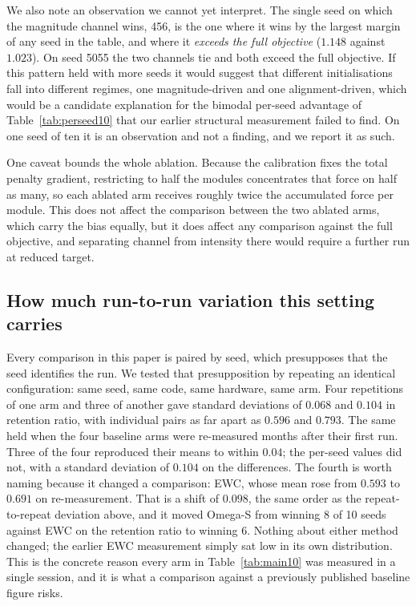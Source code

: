 \documentclass[11pt,a4paper]{article}
\begin{document}
We also note an observation we cannot yet interpret. The single seed on which
the magnitude channel wins, 456, is the one where it wins by the largest margin
of any seed in the table, and where it \emph{exceeds the full objective}
($1.148$ against $1.023$). On seed 5055 the two channels tie and both exceed
the full objective. If this pattern held with more seeds it would suggest that
different initialisations fall into different regimes, one magnitude-driven and
one alignment-driven, which would be a candidate explanation for the bimodal
per-seed advantage of Table~\ref{tab:perseed10} that our earlier structural
measurement failed to find. On one seed of ten it is an observation and not a
finding, and we report it as such.

One caveat bounds the whole ablation. Because the calibration fixes the total
penalty gradient, restricting to half the modules concentrates that force on
half as many, so each ablated arm receives roughly twice the accumulated force
per module. This does not affect the comparison between the two ablated arms,
which carry the bias equally, but it does affect any comparison against the
full objective, and separating channel from intensity there would require a
further run at reduced target.

\subsection{How much run-to-run variation this setting carries}
\label{sec:ruido}

Every comparison in this paper is paired by seed, which presupposes that the
seed identifies the run. We tested that presupposition by repeating an identical
configuration: same seed, same code, same hardware, same arm. Four repetitions
of one arm and three of another gave standard deviations of $0.068$ and $0.104$
in retention ratio, with individual pairs as far apart as $0.596$ and $0.793$.
The same held when the four baseline arms were re-measured months after their
first run. Three of the four reproduced their means to within $0.04$; the
per-seed values did not, with a standard deviation of $0.104$ on the
differences. The fourth is worth naming because it changed a comparison: EWC,
whose mean rose from $0.593$ to $0.691$ on re-measurement. That is a shift of
$0.098$, the same order as the repeat-to-repeat deviation above, and it moved
Omega-S from winning 8 of 10 seeds against EWC on the retention ratio to
winning 6. Nothing about either method changed; the earlier EWC measurement
simply sat low in its own distribution. This is the concrete reason every arm
in Table~\ref{tab:main10} was measured in a single session, and it is what a
comparison against a previously published baseline figure risks.
\end{document}
